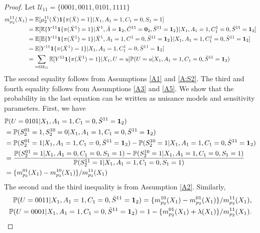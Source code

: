\documentclass{article}
\newcommand{\pr}{\mathbb{P}}
\newcommand{\E}{\mathbb{E}}
\begin{document}
\begin{proof}
Let $\mathcal{U}_{11} = \{0001,0011,0101,1111\}$
\begin{align*}
	m_{\mu_2}^{11}(X_1) 
	&= \E[\mu_2^{11}(\bar X) \mathbf{1}\{\pi(\bar X)=1\} | X_1, A_1=1, C_1=0, S_1=1] \\
	&= \E[ \E\{Y^{11}\mathbf{1}\{\pi(\bar X^1)=1\}|\bar X^1, \bar A={\bf 1}_2, \bar C^{11}={\bf 0}_2, \bar S^{11}={\bf 1}_2\} | X_1, A_1=1, C_1^1=0, \bar S^{11}={\bf 1}_2] \\
	&= \E[ \E\{Y^{11}\mathbf{1}\{\pi(\bar X^1)=1\}|\bar X^1, A_1=1, C^{1}=0, \bar S^{11}={\bf 1}_2\} | X_1, A_1=1, C_1^1=0, \bar S^{11}={\bf 1}_2] \\
	&= \E[ Y^{11}\mathbf{1}\{\pi(\bar X^1)=1\}| X_1, A_1=1, C_1^1=0, \bar S^{11}={\bf 1}_2] \\
	&= \sum_{u\in \mathcal{U}_{11}} \E[ Y^{11}\mathbf{1}\{\pi(\bar X^1)=1\}| X_1, U=u] \pr(U=u | X_1,A_1=1,C_1=0,\bar S^{11}={\bf 1}_2)
\end{align*}
The second equality follows from Assumptions \ref{A1} and \ref{A:S2}. The third and fourth equality follows from Assumptions \ref{A3} and \ref{A5}. We show that the probability in the last equation can be written as nuisance models and sensitivity parameters. First, we have
\begin{align*}
	&\pr(U=0101|X_1,A_1=1,C_1=0,\bar S^{11}={\bf 1}_2) \\
	&= \pr(S_2^{01}=1, S_2^{10}=0|X_1,A_1=1,C_1=0,\bar S^{11}={\bf 1}_2) \\
	&= \pr(S_2^{01}=1|X_1,A_1=1,C_1=0,\bar S^{11}={\bf 1}_2) - \pr(S_2^{10}=1|X_1,A_1=1,C_1=0,\bar S^{11}={\bf 1}_2) \\
	&= \frac{\pr(S_2^{01}=1|X_1,A_1=0,C_1=0,S_1=1) - \pr(S_2^{10}=1|X_1,A_1=1,C_1=0,S_1=1)} {\pr(S_2^{11}=1 | X_1,A_1=1,C_1=0,S_1=1)} \\
	&= \{m_{p_2}^{01}(X_1) - m_{p_2}^{10}(X_1)\} / m_{p_2}^{11}(X_1)
\end{align*}
The second and the third inequality is from Assumption \ref{A2}. Similarly, 
\begin{align*}
\pr(U=0011|X_1,A_1=1,C_1=0,\bar S^{11}={\bf 1}_2) 
= \{m_{p_2}^{10}(X_1) - m_{p_2}^{01}(X_1)\} / m_{p_2}^{11}(X_1), \\
\pr(U=0001|X_1,A_1=1,C_1=0,\bar S^{11}={\bf 1}_2) 
= 1 - \{m_{p_2}^{01}(X_1) + \lambda(X_1)\} / m_{p_2}^{11}(X_1).
\end{align*}


\end{proof}
\end{document}

